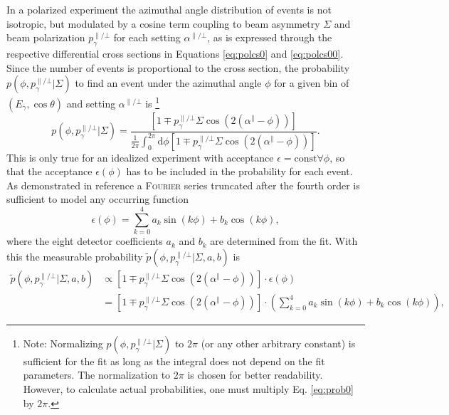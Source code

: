 In a polarized experiment the azimuthal angle distribution of events is not isotropic, but modulated by a cosine term coupling to beam asymmetry $\Sigma$ and beam polarization $p_\gamma^{\parallel/\bot}$ for each setting $\alpha^{\parallel/\bot}$, as is expressed through the respective differential cross sections in Equations \ref{eq:polcs0} and \ref{eq:polcs00}. Since the number of events is proportional to the cross section, the probability $p\left(\phi,p_\gamma^{\parallel/\bot}|\Sigma\right)$ to find an event under the azimuthal angle $\phi$ for a given bin of $\left(E_\gamma,\cos\theta\right)$ and setting $\alpha^{\parallel/\bot}$ is \footnote{Note: Normalizing $p\left(\phi,p_\gamma^{\parallel/\bot}\big|\Sigma\right)$ to $2\pi$ (or any other arbitrary constant) is sufficient for the fit as long as the integral does not depend on the fit parameters. The normalization to $2\pi$ is chosen for better readability. However, to calculate actual probabilities, one must multiply Eq. \eqref{eq:prob0} by $2\pi$.} \begin{equation}
	p\left(\phi,p_\gamma^{\parallel/\bot}\big|\Sigma\right)=\frac{\left[1\mp p_\gamma^{\parallel/\bot}\Sigma\cos\left(2\left(\alpha^\parallel-\phi\right)\right)\right]}{\frac{1}{2\pi}\int_{0}^{2\pi}\text{d}\phi\left[1\mp p_\gamma^{\parallel/\bot}\Sigma\cos\left(2\left(\alpha^\parallel-\phi\right)\right)\right] }.
	\label{eq:prob0}
\end{equation}
This is only true for an idealized experiment with acceptance $\epsilon=\text{const}\forall\phi$, so that the acceptance $\epsilon(\phi)$ has to be included in the probability for each event. As demonstrated in reference \cite{hartmannphd} a \textsc{Fourier} series truncated after the fourth order is sufficient to model any occurring function $$\epsilon\left(\phi\right)=\sum_{k=0}^4a_k\sin\left( k\phi\right)+b_k\cos\left(k\phi\right),$$ where the eight detector coefficients $a_k$ and $b_k$ are determined from the fit. With this the measurable probability $\tilde{p}\left(\phi,p_\gamma^{\parallel/\bot}\big|\Sigma,a,b\right)$ is 
\begin{align}
	\tilde{p}\left(\phi,p_\gamma^{\parallel/\bot}\big|\Sigma,a,b\right)&\propto\left[1\mp p_\gamma^{\parallel/\bot}\Sigma\cos\left(2\left(\alpha^\parallel-\phi\right)\right)\right]\cdot\epsilon(\phi)\\&=\left[1\mp p_\gamma^{\parallel/\bot}\Sigma\cos\left(2\left(\alpha^\parallel-\phi\right)\right)\right]\cdot\left(\sum_{k=0}^4a_k\sin\left( k\phi\right)+b_k\cos\left(k\phi\right)\right),
\end{align}
